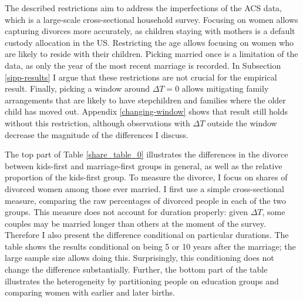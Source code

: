 \documentclass[12pt,letter]{article}
\begin{document}
The described restrictions aim to address the imperfections of the ACS data, which is a large-scale cross-sectional household survey. Focusing on women allows capturing divorces more accurately, as children staying with mothers is a default custody allocation in the US. Restricting the age allows focusing on women who are likely to reside with their children. Picking married once is a limitation of the data, as only the year of the most recent marriage is recorded. In Subsection \ref{sipp-results} I argue that these restrictions are not crucial for the empirical result. Finally, picking a window around $\Delta T = 0$ allows mitigating family arrangements that are likely to have stepchildren and families where the older child has moved out. Appendix \ref{changing-window} shows that result still holds without this restriction, although observations with $\Delta T$ outside the window decrease the magnitude of the differences I discuss.



The top part of Table \ref{share_table_0} illustrates the differences in the divorce between kids-first and marriage-first groups in general, as well as the relative proportion of the kids-first group. To measure the divorce, I focus on shares of divorced women among those ever married. I first use a simple cross-sectional measure, comparing the raw percentages of divorced people in each of the two groups. This measure does not account for duration properly: given $\Delta T$, some couples may be married longer than others at the moment of the survey. Therefore I also present the difference conditional on particular durations. The table shows the results conditional on being 5 or 10  years after the marriage; the large sample size allows doing this. Surprisingly, this conditioning does not change the difference substantially. Further, the bottom part of the table illustrates the heterogeneity by partitioning people on education groups and comparing women with earlier and later births.  
\end{document}
